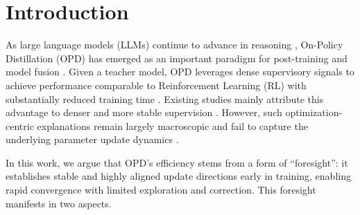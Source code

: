 \documentclass{article}
\begin{document}
\section{Introduction}


As large language models (LLMs) continue to advance in reasoning \citep{OpenAI2025,deepseekai2025deepseekr1incentivizingreasoningcapability}, On-Policy Distillation (OPD) has emerged as an important paradigm for post-training and model fusion \citep{agarwal2024onpolicydistillationlanguagemodels,xiao2026mimo,deepseek2026v4}. Given a teacher model, OPD leverages dense supervisory signals to achieve performance comparable to Reinforcement Learning (RL) with substantially reduced training time \citep{Venkatkrishna2026AletheiaWM,yang2025qwen3technicalreport}. Existing studies mainly attribute this advantage to denser and more stable supervision \citep{he2026far,yue2025doesreinforcementlearningreally}. However, such optimization-centric explanations remain largely macroscopic and fail to capture the underlying parameter update dynamics \citep{zhang2025surveyreinforcementlearninglarge}.

In this work, we argue that OPD's efficiency stems from a form of ``foresight'': it establishes stable and highly aligned update directions early in training, enabling rapid convergence with limited exploration and correction. This foresight manifests in two aspects.
\end{document}
